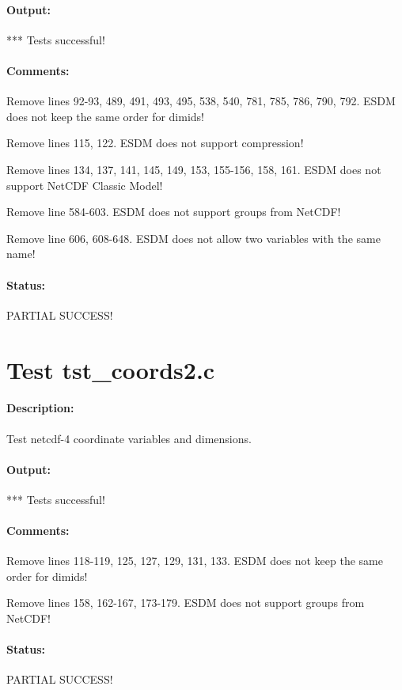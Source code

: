 \paragraph{Output:} *** Tests successful!

\paragraph{Comments:} Remove lines 92-93, 489, 491, 493, 495, 538, 540, 781, 785, 786, 790, 792. ESDM does not keep the same order for dimids!

Remove lines 115, 122. ESDM does not support compression!

Remove lines 134, 137, 141, 145, 149, 153, 155-156, 158, 161. ESDM does not support NetCDF Classic Model!

Remove line 584-603. ESDM does not support groups from NetCDF!

Remove line 606, 608-648. ESDM does not allow two variables with the same name!

\paragraph{Status:} PARTIAL SUCCESS!

\section{Test tst\_coords2.c}

\paragraph{Description:} Test netcdf-4 coordinate variables and dimensions.

\paragraph{Output:} *** Tests successful!

\paragraph{Comments:} Remove lines 118-119, 125, 127, 129, 131, 133. ESDM does not keep the same order for dimids!

Remove lines 158, 162-167, 173-179. ESDM does not support groups from NetCDF!

\paragraph{Status:} PARTIAL SUCCESS!

